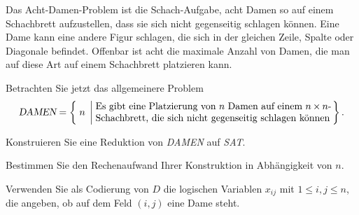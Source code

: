 Das Acht-Damen-Problem ist die Schach-Aufgabe, acht Damen so auf einem
Schachbrett aufzustellen, dass sie sich nicht gegenseitig schlagen können.
Eine Dame kann eine andere Figur schlagen, die sich in der gleichen Zeile,
Spalte oder Diagonale befindet.
Offenbar ist acht die maximale Anzahl von Damen, die man auf diese Art auf
einem Schachbrett platzieren kann.

Betrachten Sie jetzt das allgemeinere Problem
\[
\textsl{DAMEN}
=
\left\{\; n
\;\left|\;
\begin{minipage}{0.7\hsize}
Es gibt eine Platzierung von $n$ Damen auf einem $n\times n$-Schachbrett,
die sich nicht gegenseitig schlagen können
\end{minipage}\right.\right\}.
\]
\begin{teilaufgaben}
\item
Konstruieren Sie eine Reduktion von \textsl{DAMEN} auf \textsl{SAT}.
\item
Bestimmen Sie den Rechenaufwand Ihrer Konstruktion in Abhängigkeit von $n$.
\end{teilaufgaben}

\begin{hinweis}
Verwenden Sie als Codierung von $D$ die logischen Variablen $x_{ij}$
mit $1\le i,j\le n$, die angeben, ob auf dem Feld $(i,j)$ eine Dame
steht.
\end{hinweis}


